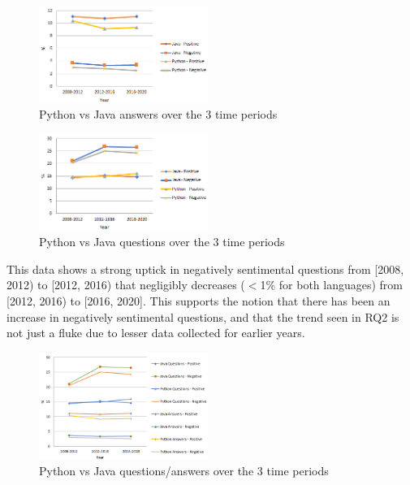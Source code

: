 \documentclass[conference]{IEEEtran}
\begin{document}
\begin{figure}[htbp]
\centerline{\includegraphics[width=0.49\textwidth]{figures/Java-python-answers.png}}
\caption{Python vs Java answers over the 3 time periods}
\label{fig}
\end{figure}

\begin{figure}[htbp]
\centerline{\includegraphics[width=0.49\textwidth]{figures/Java-python-questions.png}}
\caption{Python vs Java questions over the 3 time periods}
\label{fig}
\end{figure}

This data shows a strong uptick in negatively sentimental questions from [2008, 2012) to [2012, 2016) that negligibly decreases ($<$1\% for both languages) from [2012, 2016) to  [2016, 2020]. This supports the notion that there has been an increase in negatively sentimental questions, and that the trend seen in RQ2 is not just a fluke due to lesser data collected for earlier years.\\

\begin{figure}[htbp]
\centerline{\includegraphics[width=0.49\textwidth]{figures/Java-python-combined.png}}
\caption{Python vs Java questions/answers over the 3 time periods}
\label{fig}
\end{figure}
\end{document}
